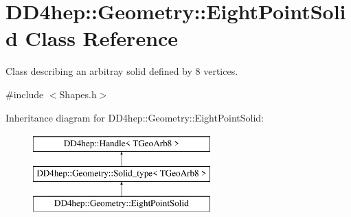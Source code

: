 \hypertarget{class_d_d4hep_1_1_geometry_1_1_eight_point_solid}{}\section{D\+D4hep\+:\+:Geometry\+:\+:Eight\+Point\+Solid Class Reference}
\label{class_d_d4hep_1_1_geometry_1_1_eight_point_solid}


Class describing an arbitray solid defined by 8 vertices.  




{\ttfamily \#include $<$Shapes.\+h$>$}

Inheritance diagram for D\+D4hep\+:\+:Geometry\+:\+:Eight\+Point\+Solid\+:\begin{figure}[H]
\begin{center}
\leavevmode
\includegraphics[height=3.000000cm]{class_d_d4hep_1_1_geometry_1_1_eight_point_solid}
\end{center}
\end{figure}
